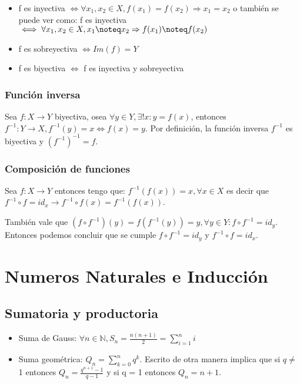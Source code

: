 \documentclass{article}
\begin{document}
\begin{itemize}
    \item f es inyectiva $\iff \forall x_1,x_2 \in X, f(x_1)=f(x_2) \Rightarrow x_1 = x_2$ o también se puede ver como: f es inyectiva $\iff \forall x_1,x_2 \in X, x_1\noteq x_2 \Rightarrow f(x_1) \noteq f(x_2)$
    \item f es sobreyectiva $\iff Im(f) = Y$
    \item f es biyectiva $\iff$ f es inyectiva y sobreyectiva
\end{itemize}

\subsubsection{Función inversa}
Sea $f:X \rightarrow Y$ biyectiva, osea $\forall y \in Y, \exists!x: y = f(x)$, entonces $f^{-1}:Y \rightarrow X, f^{-1}(y) = x \iff f(x) = y$. Por definición, la función inversa $f^{-1}$ es biyectiva y $(f^{-1})^{-1} = f$.

\subsubsection{Composición de funciones}
Sea $f:X \rightarrow Y$ entonces tengo que: $f^{-1}(f(x)) = x, \forall x \in X$ es decir que $f^{-1}\circ f = id_x \rightarrow f^{-1}\circ f(x) = f^{-1}(f(x))$. 

También vale que  $(f\circ f^{-1})(y) = f(f^{-1}(y)) = y, \forall y \in Y: f\circ f^{-1}=id_y$. Entonces podemos concluir que se cumple $f\circ f^{-1} = id_y$ y $f^{-1}\circ f = id_x$.

\section{Numeros Naturales e Inducción}
\subsection{Sumatoria y productoria}
\begin{itemize}
    \item Suma de Gauss: \begin{math}
        \forall n \in \mathbb{N}, S_n = \frac{n(n+1)}{2} = \sum_{i=1}^{n} i
    \end{math}
    \item Suma geométrica: \begin{math}
        Q_n = \sum_{k=0}^n q^k 
    \end{math}. Escrito de otra manera implica que si $q \neq$ 1 entonces \begin{math}
        Q_n = \frac{q^{n+1} - 1}{q-1}
    \end{math} y si q = 1 entonces $Q_n = n + 1$.
\end{itemize}
\end{document}
